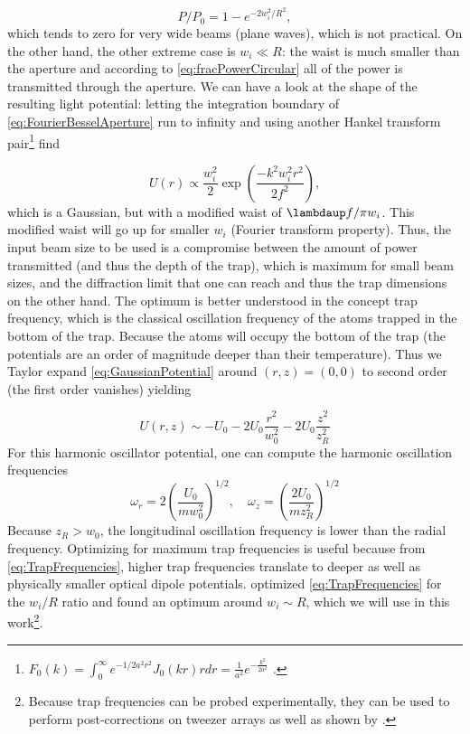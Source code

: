 \begin{equation}\label{eq:fracPowerCircular}
    P/P_0 = 1 - e^{-2w_i^2/R^2},
\end{equation}
which tends to zero for very wide beams (plane waves), which is not practical. 
On the other hand, the other extreme case is $w_i \ll R$: the waist is much smaller than the aperture and according to \cref{eq:fracPowerCircular} all of the power is transmitted through the aperture.
We can have a look at the shape of the resulting light potential: letting the integration boundary of \cref{eq:FourierBesselAperture} run to infinity and using another Hankel transform pair\footnote{$F_0(k) = \int_0^{\infty} e^{-1/2 a^2 r^2} J_0(k r)r dr = \frac{1}{a^2} e^{-\frac{k^2}{2a^2}}$ \cite{Papoulis2981}.} find 

\begin{equation}\label{eq:GaussianCase}
    U(r) \propto \frac{w_i^2}{2} \exp{\left(\frac{-k^2w_i^2 r^2}{2f^2}\right)},
\end{equation}
which is a Gaussian, but with a modified waist of $\lambdaup f / \pi w_i$.
This modified waist will go up for smaller $w_i$ (Fourier transform property). 
Thus, the input beam size to be used is a compromise between the amount of power transmitted (and thus the depth of the trap), which is maximum for small beam sizes, and the diffraction limit that one can reach and thus the trap dimensions on the other hand. 
The optimum is better understood in the concept trap frequency, which is the classical oscillation frequency of the atoms trapped in the bottom of the trap. 
Because the atoms will occupy the bottom of the trap (the potentials are an order of magnitude deeper than their temperature).
Thus we Taylor expand \cref{eq:GaussianPotential} around $(r,z)=(0,0)$ to second order (the first order vanishes) yielding

\begin{equation}\label{eq:ApproximateGaussianPotential}
    U(r,z) \sim -U_0 - 2U_0 \frac{r^2}{w_0^2} - 2U_0 \frac{z^2}{z_R^2}
\end{equation}
For this harmonic oscillator potential, one can compute the harmonic oscillation frequencies 
\begin{equation}\label{eq:TrapFrequencies}
    \omega_r = 2\left(\frac{U_0}{m w_0^2}\right)^{1/2}, \quad
    \omega_z= \left(\frac{2 U_0}{m z_R^2}\right)^{1/2}
\end{equation}
Because $z_R > w_0$, the longitudinal oscillation frequency is lower than the radial frequency. 
Optimizing for maximum trap frequencies is useful because from \cref{eq:TrapFrequencies}, higher trap frequencies translate to deeper as well as physically smaller optical dipole potentials.
\cite{Madjarov2021} optimized \cref{eq:TrapFrequencies} for the $w_i/R$ ratio and found an optimum around $w_i\sim R$, which we will use in this work\footnote{Because trap frequencies can be probed experimentally, they can be used to perform post-corrections on tweezer arrays as well as shown by \cite{Ebadi2021}.}.


